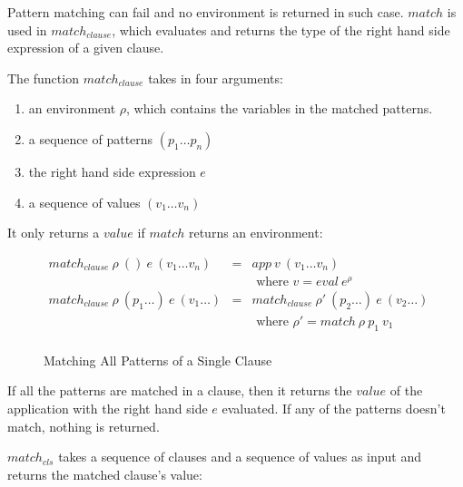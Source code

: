 \documentclass[acmsmall]{acmart}
\begin{document}
Pattern matching can fail and no environment is returned in such case. $match$ is used in $match_{clause}$, which evaluates and returns the type of the right hand side expression of a given clause.

The function $match_{clause}$ takes in four arguments:

\begin{enumerate}
  \item an environment $\rho$, which contains the variables in the matched patterns.
  \item a sequence of patterns $(p_1 \dots p_n)$
  \item the right hand side expression $e$
  \item a sequence of values $(v_1 \dots v_n)$
\end{enumerate}

It only returns a $value$ if $match$ returns an environment:

\begin{figure}[H]
  \begin{equation*}
    \begin{aligned}
      match_{clause} \: \rho \: () \: e \: (v_1 \dots v_n)      & = & app \: v \: (v_1 \dots v_n)                                \\
                                                                &   & \textrm{ where } v = eval \: e^{\rho}                      \\
      match_{clause} \: \rho \: (p_1 \dots) \: e \: (v_1 \dots) & = & match_{clause} \: \rho' \: (p_2 \dots) \: e \: (v_2 \dots) \\
                                                                &   & \textrm{ where } \rho' = match \: \rho \: p_1 \: v_1       \\                                                        
    \end{aligned}
  \end{equation*}
  \caption{Matching All Patterns of a Single Clause}
\end{figure}

If all the patterns are matched in a clause, then it returns the $value$ of the application with the right hand side $e$ evaluated. If any of the patterns doesn't match, nothing is returned.

$match_{cls}$ takes a sequence of clauses and a sequence of values as input and returns the matched clause's value:
\end{document}
